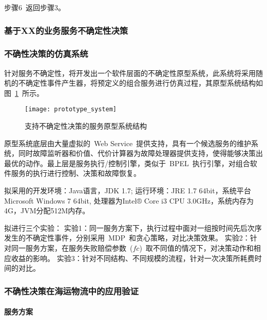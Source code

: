 步骤6~返回步骤3。

\subsubsection{基于XX的业务服务不确定性决策}



\subsubsection{不确性决策的仿真系统}

针对服务不确定性，将开发出一个软件层面的不确定性原型系统，此系统将采用随机的不确定性事件产生器，将预定义的组合服务进行仿真过程，其原型系统结构如图~\ref{figure:prototype_system}~所示。

\begin{figure}[htbp]
    \centering
    \texttt{[image: prototype\_system]}
    \caption{支持不确定性决策的服务原型系统结构}\label{figure:prototype_system}
    \vspace{-1em}
\end{figure}

原型系统底层由大量虚拟的~Web Service~提供支持，具有一个候选服务的维护系统，同时故障监听器和价值、代价计算器为故障处理器提供支持，使得能够决策出最优的动作。最上层是服务执行/控制引擎，类似于~BPEL~执行引擎，对组合软件服务的执行进行控制、决策和故障恢复。

拟采用的开发环境：Java语言，JDK 1.7; 运行环境：JRE 1.7 64bit，系统平台Microsoft Windows 7 64bit, 处理器为Intel® Core i3 CPU 3.0GHz，系统内存为4G，JVM分配512M内存。

拟进行三个实验：
实验1：同一服务方案下，执行过程中面对一组按时间先后次序发生的不确定性事件，分别采用~MDP~和贪心策略，对比决策效果。
实验2：针对同一服务方案，在服务失败赔偿参数~($fc$)~取不同值的情况下，对决策动作和相应收益的影响。
实验3：针对不同结构、不同规模的流程，针对一次决策所耗费时间的对比。

\subsubsection{不确性决策在海运物流中的应用验证}

\paragraph{服务方案}

%

